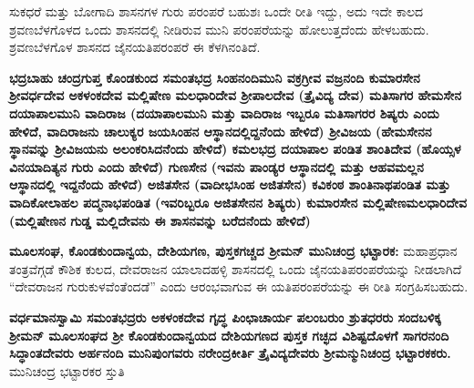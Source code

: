 ಸುಕಧರೆ ಮತ್ತು ಬೋಗಾದಿ ಶಾಸನಗಳ ಗುರು ಪರಂಪರೆ ಬಹುಶಃ ಒಂದೇ ರೀತಿ ಇದ್ದು, ಅದು ಇದೇ ಕಾಲದ ಶ್ರವಣಬೆಳಗೊಳದ ಒಂದು ಶಾಸನದಲ್ಲಿ ನೀಡಿರುವ ಮುನಿ ಪರಂಪರೆಯನ್ನು ಹೋಲುತ್ತದೆಂದು ಹೇಳಬಹುದು. ಶ್ರವಣಬೆಳಗೊಳ ಶಾಸನದ ಜೈನಯತಿಪರಂಪರೆ ಈ ಕೆಳಗಿನಂತಿದೆ.

\textbf{ಭದ್ರಬಾಹು \general{\enginline{-}} ಚಂದ್ರಗುಪ್ತ \general{\enginline{-}} ಕೊಂಡಕುಂದ \general{\enginline{-}} ಸಮಂತಭದ್ರ \general{\enginline{-}} ಸಿಂಹನಂದಿಮುನಿ \general{\enginline{-}} ವಕ್ರಗ್ರೀವ \general{\enginline{-}} ವಜ್ರನಂದಿ \general{\enginline{-}} ಕುಮಾರಸೇನ \general{\enginline{-}} ಶ‍್ರೀವರ್ಧದೇವ \general{\enginline{-}} ಅಕಳಂಕದೇವ \general{\enginline{-}} ಮಲ್ಲಿಷೇಣ ಮಲಧಾರಿದೇವ \general{\enginline{-}} ಶ‍್ರೀಪಾಲದೇವ (ತ್ರೈವಿದ್ಯ ದೇವ) \general{\enginline{-}} ಮತಿಸಾಗರ \general{\enginline{-}} ಹೇಮಸೇನ \general{\enginline{-}} ದಯಾಪಾಲಮುನಿ \general{\enginline{-}} ವಾದಿರಾಜ (ದಯಾಪಾಲಮುನಿ ಮತ್ತು ವಾದಿರಾಜ ಇಬ್ಬರೂ ಮತಿಸಾಗರರ ಶಿಷ್ಯರು ಎಂದು ಹೇಳಿದೆ, ವಾದಿರಾಜನು ಚಾಲುಕ್ಯರ ಜಯಸಿಂಹನ ಆಸ್ಥಾನದಲ್ಲಿದ್ದನೆಂದು ಹೇಳಿದೆ) \general{\enginline{-}} ಶ‍್ರೀವಿಜಯ (ಹೇಮಸೇನನ ಸ್ಥಾನವನ್ನು ಶ‍್ರೀವಿಜಯನು ಅಲಂಕರಿಸಿದನೆಂದು ಹೇಳಿದೆ) \general{\enginline{-}} ಕಮಲಭದ್ರ \general{\enginline{-}} ದಯಾಪಾಲ ಪಂಡಿತ \general{\enginline{-}} ಶಾಂತಿದೇವ (ಹೊಯ್ಸಳ ವಿನಯಾದಿತ್ಯನ ಗುರು ಎಂದು ಹೇಳಿದೆ) \general{\enginline{-}} ಗುಣಸೇನ (ಇವನು ಪಾಂಡ್ಯರ ಆಸ್ಥಾನದಲ್ಲಿ ಮತ್ತು ಆಹವಮಲ್ಲನ ಆಸ್ಥಾನದಲ್ಲಿ ಇದ್ದನೆಂದು ಹೇಳಿದೆ) \general{\enginline{-}} ಅಜಿತಸೇನ (ವಾದೀಭಸಿಂಹ ಅಜಿತಸೇನ) \general{\enginline{-}} ಕವಿಕಂಠ ಶಾಂತಿನಾಥಪಂಡಿತ ಮತ್ತು ವಾದಿಕೋಲಾಹಲ ಪದ್ಮನಾಭಪಂಡಿತ (ಇವರಿಬ್ಬರೂ ಅಜಿತಸೇನನ ಶಿಷ್ಯರು) \general{\enginline{-}} ಕುಮಾರಸೇನ \general{\enginline{-}}\general{\break } ಮಲ್ಲಿಷೇಣಮಲಧಾರಿದೇವ \general{\enginline{-}} (ಮಲ್ಲಿಷೇಣನ ಗುಡ್ಡ ಮಲ್ಲಿದೇವನು ಈ ಶಾಸನವನ್ನು ಬರೆದನೆಂದು ಹೇಳಿದೆ)}

\textbf{ಮೂಲಸಂಘ, ಕೊಂಡಕುಂದಾನ್ವಯ, ದೇಶಿಯಗಣ, ಪುಸ್ತಕಗಚ್ಚದ ಶ‍್ರೀಮನ್​ ಮುನಿಚಂದ್ರ ಭಟ್ಟಾರಕ:} ಮಹಾಪ್ರಧಾನ ತಂತ್ರವೆಗ್ಗಡೆ ಕೌಶಿಕ ಕುಲದ, ದೇವರಾಜನ ಯಾಲಾದಹಳ್ಳಿ ಶಾಸನದಲ್ಲಿ ಒಂದು ಜೈನಯತಿಪರಂಪರೆಯನ್ನು ನೀಡಲಾಗಿದೆ “ದೇವರಾಜನ ಗುರುಕುಳವೆಂತೆಂದಡೆ” ಎಂದು ಆರಂಭವಾಗುವ ಈ ಯತಿಪರಂಪರೆಯನ್ನು ಈ ರೀತಿ ಸಂಗ್ರಹಿಸಬಹುದು.

\textbf{ವರ್ಧಮಾನಸ್ವಾಮಿ \general{\enginline{-}} ಸಮಂತಭದ್ರರು \general{\enginline{-}} ಅಕಳಂಕದೇವ \general{\enginline{-}} ಗೃದ್ಧ ಪಿಂಛಾಚಾರ್ಯ \general{\enginline{-}} ಪಲಂಬರುಂ ಶ್ರುತಧರರು ಸಂದಬಳಿಕ್ಕ ಶ‍್ರೀಮನ್​ ಮೂಲಸಂಘದ ಶ‍್ರೀ ಕೊಂಡಕುಂದಾನ್ವಯದ ದೇಶಿಯಗಣದ ಪುಸ್ತಕ ಗಚ್ಛದ ವಿಶಿಷ್ಟದೊಳಗೆ \general{\enginline{-}} ಸಾಗರನಂದಿ ಸಿದ್ಧಾಂತದೇವರು \general{\enginline{-}} ಅರ್ಹನಂದಿ ಮುನಿಪುಂಗವರು \general{\enginline{-}} ನರೇಂದ್ರಕೀರ್ತಿ ತ್ರೈವಿದ್ಯದೇವರು \general{\enginline{-}} ಶ‍್ರೀಮನ್ಮುನಿಚಂದ್ರ ಭಟ್ಟಾರಕಕರು.} ಮುನಿಚಂದ್ರ ಭಟ್ಟಾರಕರ ಸ್ತುತಿ

